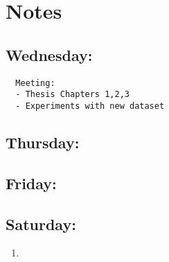 \documentclass[12pt,oneside]{book}
\begin{document}
  \section*{Notes}
  \setlength\parindent{0pt}

  \subsection*{Wednesday:}
  \begin{lstlisting}
  Meeting:
  - Thesis Chapters 1,2,3
  - Experiments with new dataset
  \end{lstlisting}

  \subsection*{Thursday:}

  \subsection*{Friday:}

  \subsection*{Saturday:}
  \begin{enumerate}
    \item 
  \end{enumerate}
  
\end{document}
